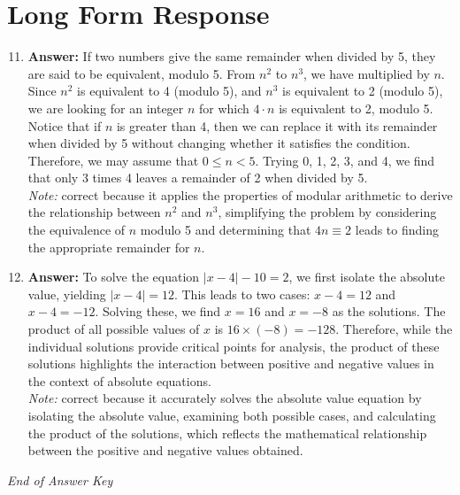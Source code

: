 \documentclass[12pt]{article}
\begin{document}
\section*{Long Form Response}
\begin{enumerate}[label=\arabic*.]
\setcounter{enumi}{10}
\item \textbf{Answer:} If two numbers give the same remainder when divided by 5, they are said to be equivalent, modulo 5. From $n^2$ to $n^3$, we have multiplied by $n$. Since $n^2$ is equivalent to 4 (modulo 5), and $n^3$ is equivalent to 2 (modulo 5), we are looking for an integer $n$ for which $4\cdot n$ is equivalent to 2, modulo 5. Notice that if $n$ is greater than 4, then we can replace it with its remainder when divided by 5 without changing whether it satisfies the condition. Therefore, we may assume that $0\leq n <5$. Trying 0, 1, 2, 3, and 4, we find that only $\boxed{3}$ times 4 leaves a remainder of 2 when divided by 5.
\\ \textit{Note:} correct because it applies the properties of modular arithmetic to derive the relationship between \( n^2 \) and \( n^3 \), simplifying the problem by considering the equivalence of \( n \) modulo 5 and determining that \( 4 n \equiv 2 \) leads to finding the appropriate remainder for \( n \).
\item \textbf{Answer:} To solve the equation \( |x-4| - 10 = 2 \), we first isolate the absolute value, yielding \( |x-4| = 12 \). This leads to two cases: \( x-4 = 12 \) and \( x-4 = -12 \). Solving these, we find \( x = 16 \) and \( x = -8 \) as the solutions. The product of all possible values of \( x \) is \( 16 \times (-8) = -128 \). Therefore, while the individual solutions provide critical points for analysis, the product of these solutions highlights the interaction between positive and negative values in the context of absolute equations.
\\ \textit{Note:} correct because it accurately solves the absolute value equation by isolating the absolute value, examining both possible cases, and calculating the product of the solutions, which reflects the mathematical relationship between the positive and negative values obtained.
\end{enumerate}

\vfill
\noindent\textit{End of Answer Key}
\end{document}
